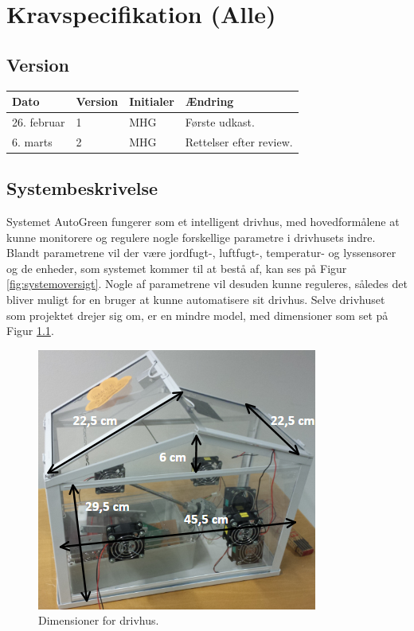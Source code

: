 \chapter{Kravspecifikation (Alle)}

\section{Version}
\begin{table}[h]
	\centering
	\begin{tabularx}{\textwidth - 2cm}{|l|l|l|X|}
	\hline
	Dato	& Version	& Initialer & Ændring	\\ \hline
	26. februar & 1 & MHG & Første udkast. \\ \hline
	6. marts & 2 & MHG & Rettelser efter review. \\ \hline
	\end{tabularx}
\end{table}

\section{Systembeskrivelse}

Systemet AutoGreen fungerer som et intelligent drivhus, med hovedformålene at kunne monitorere og regulere nogle forskellige parametre i drivhusets indre. Blandt parametrene vil der være jordfugt-, luftfugt-, temperatur- og lyssensorer og de enheder, som systemet kommer til at bestå af, kan ses på Figur \ref{fig:systemoversigt}. Nogle af parametrene vil desuden kunne reguleres, således det bliver muligt for en bruger at kunne automatisere sit drivhus. Selve drivhuset som projektet drejer sig om, er en mindre model, med dimensioner som set på Figur \ref{fig:dimensioner}. 

\begin{figure}[!h]
\centering 
\includegraphics[scale=0.9] {../fig/dimensioner.png}
\caption{Dimensioner for drivhus.}
\label{fig:dimensioner}
\end{figure}


